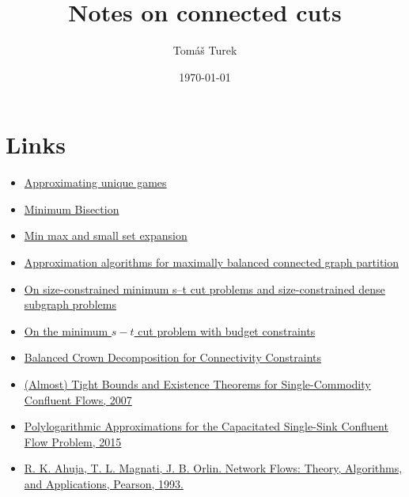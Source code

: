 \documentclass{article}
\title{Notes on connected cuts}
\author{Tomáš Turek}
\date{\today}
\theoremstyle{plain}
\theoremstyle{plain}
\theoremstyle{remark}
\begin{document}
	\maketitle
	
	\tableofcontents
	
	\section*{Links}
	
	{\small \begin{itemize}
		\item \href{https://www.semanticscholar.org/paper/Approximating-unique-games-Gupta-Talwar/a90ecfd407e1730c9039fdc46e7efefcc46dcfda}{Approximating unique games}
		\item \href{https://www.khoury.northeastern.edu/home/austin/papers/bisection.pdf}{Minimum Bisection}
		\item \href{https://epubs.siam.org/doi/abs/10.1137/120873996}{Min max and small set expansion}
		\item \href{https://link.springer.com/article/10.1007/s00453-021-00870-3}{Approximation algorithms for maximally balanced connected graph partition}
		\item \href{https://www.sciencedirect.com/science/article/pii/S0304397515009378}{On size-constrained minimum s–t cut problems and size-constrained dense subgraph problems}
		\item \href{https://link.springer.com/article/10.1007/s10107-023-01987-9}{On the minimum $s-t$ cut problem with budget constraints}
		\item \href{https://drops.dagstuhl.de/entities/document/10.4230/LIPIcs.ESA.2021.26}{Balanced Crown Decomposition for Connectivity Constraints}
		\item \href{https://www.cs.cornell.edu/~rdk/papers/conflu.pdf}{(Almost) Tight Bounds and Existence Theorems for Single-Commodity Confluent Flows, 2007}
		\item \href{https://ieee-focs.org/FOCS-2015-Papers/8191a748.pdf}{Polylogarithmic Approximations for the Capacitated Single-Sink Conﬂuent Flow Problem, 2015}
		\item \href{https://www.semanticscholar.org/paper/Network-Flows%3A-Theory%2C-Algorithms%2C-and-Applications-Ahuja-Magnanti/68d54f9dacbb5416c1aafb3399c072497c320021}{R. K. Ahuja, T. L. Magnati, J. B. Orlin. Network Flows: Theory, Algorithms, and Applications, Pearson, 1993.}
	\end{itemize}}
	
\end{document}
